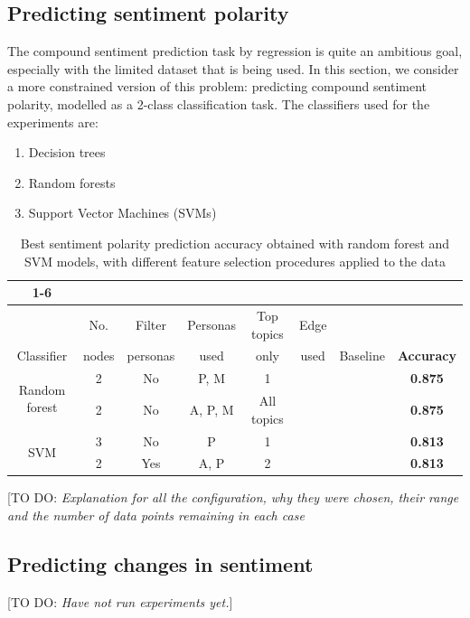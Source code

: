 \documentclass[bsc,frontabs,singlespacing,parskip]{infthesis} %
\begin{document}
\subsection{Predicting sentiment polarity}
The compound sentiment prediction task by regression is quite an ambitious goal, especially with the limited dataset that is being used. In this section, we consider a more constrained version of this problem: predicting compound sentiment polarity, modelled as a 2-class classification task. The classifiers used for the experiments are:

\begin{enumerate}
	\item Decision trees
	\item Random forests
	\item Support Vector Machines (SVMs)
\end{enumerate}

\begin{table}[ht!]
\begin{tabular}{ |c|c|c|c|c|c|c|c| }
\cline{1-6}
\multicolumn{6}{ |c| }{Configuration}\\
\hline
 & No. & Filter & Personas & Top topics & Edge & & \\
Classifier & nodes & personas & used & only & used & Baseline & \textbf{Accuracy} \\ \hline
\multirow{2}{*}{Random forest} 
 & 2 & No & P, M & 1 & & & \textbf{0.875}\\
 & 2 & No & A, P, M & All topics & & & \textbf{0.875}\\ \hline
\multirow{2}{*}{SVM}
 & 3 & No & P & 1 & & & \textbf{0.813}\\ 
 & 2 & Yes & A, P & 2 & & & \textbf{0.813}\\ \hline
\end{tabular}

\caption{Best sentiment polarity prediction accuracy obtained with random forest and SVM models, with different feature selection procedures applied to the data}

\end{table}

[TO DO: \textit{Explanation for all the configuration, why they were chosen, their range and the number of data points remaining in each case}

\subsection{Predicting changes in sentiment}
[TO DO: \textit{Have not run experiments yet.}]



\end{document}
